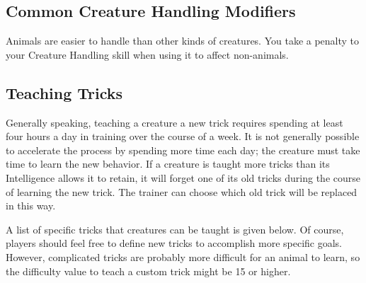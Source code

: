   \subsection{Common Creature Handling Modifiers}
    Animals are easier to handle than other kinds of creatures.
    You take a  penalty to your Creature Handling skill when using it to affect non-animals.

  \subsection{Teaching Tricks}
    Generally speaking, teaching a creature a new trick requires spending at least four hours a day in training over the course of a week.
    It is not generally possible to accelerate the process by spending more time each day; the creature must take time to learn the new behavior.
    If a creature is taught more tricks than its Intelligence allows it to retain, it will forget one of its old tricks during the course of learning the new trick.
    The trainer can choose which old trick will be replaced in this way.

    A list of specific tricks that creatures can be taught is given below.
    Of course, players should feel free to define new tricks to accomplish more specific goals.
    However, complicated tricks are probably more difficult for an animal to learn, so the difficulty value to teach a custom trick might be 15 or higher.

